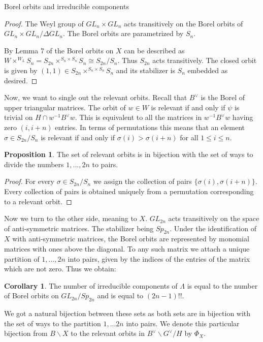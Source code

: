 \documentclass[12pt]{article}
\newcommand{\<}{\langle}
\renewcommand{\>}{\rangle}
\theoremstyle{plain}
\theoremstyle{definition}
\newtheorem{prop}[theorem]{Proposition}
\newtheorem{cor}[theorem]{Corollary}
\begin{document}
\begin{section}{Borel orbits and irreducible components}
\begin{proof}
    The Weyl group of $GL_n\times GL_n$ acts transitively on the Borel orbits of $GL_n\times GL_n/\Delta GL_n$. The Borel orbits are parametrized by $S_n$.
    
    
    By Lemma 7 of \cite{Brion2001OnOC} the Borel orbits on $X$ can be described as $W\times^{W_L} S_n=S_{2n}\times^{S_n\times S_n} S_n\cong S_{2n}/S_n$. Thus $S_{2n}$ acts transitively. The closed orbit is given by $(1,1)\in S_{2n}\times^{S_n\times S_n} S_n$ and its stabilizer is $S_n$ embedded as desired.
\end{proof}

Now, we want to single out the relevant orbits. Recall that $B^\vee$ is the Borel of upper triangular matrices. The orbit of $w\in W$ is relevant if and only if $\psi$ is trivial on $H\cap w^{-1}B^\vee w$. This is equivalent to all the matrices in $w^{-1}B^\vee w$ having zero $(i,i+n)$ entries. In terms of permutations this means that an element $\sigma\in S_{2n}/S_n$ is relevant if and only if $\sigma(i)>\sigma(i+n)$ for all $1\leq i\leq n$.

\begin{prop}
    The set of relevant orbits is in bijection with the set of ways to divide the numbers $1,...,2n$ to pairs.
\end{prop}

\begin{proof}
    For every $\sigma\in S_{2n}/S_n$ we assign the collection of pairs $\{\sigma(i),\sigma(i+n)\}$. Every collection of pairs is obtained uniquely from a permutation corresponding to a relevant orbit.
\end{proof}

Now we turn to the other side, meaning to $X$. $GL_{2n}$ acts transitively on the space of anti-symmetric matrices. The stabilizer being $Sp_{2n}$. Under the identification of $X$ with anti-symmetric matrices, the Borel orbits are represented by monomial matrices with ones above the diagonal. To any such matrix we attach a unique partition of $1,...,2n$ into pairs, given by the indices of the entries of the matrix which are not zero. Thus we obtain:

\begin{cor}
    The number of irreducible components of $\Lambda$ is equal to the number of Borel orbits on $GL_{2n}/Sp_{2n}$ and is equal to $(2n-1)!!$.
\end{cor}

We got a natural bijection between these sets as both sets are in bijection with the set of ways to the partition $1,...2n$ into pairs. We denote this particular bijection from  $B\backslash X$ to the relevant orbits in $B^\vee\backslash G^\vee/H$ by $\Phi_X$.



\end{section}
\end{document}
